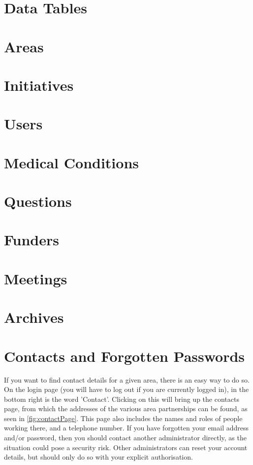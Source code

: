 \documentclass{bhcguides}
\begin{document}
\section{Data Tables}
\label{sec:datatables}

\section{Areas}
\label{sec:areas}

\section{Initiatives}
\label{sec:initiatives}

\section{Users}
\label{sec:users}

\section{Medical Conditions}
\label{sec:medical}

\section{Questions}
\label{sec:questions}

\section{Funders}
\label{sec:funders}

\section{Meetings}
\label{sec:meetings}

\section{Archives}
\label{sec:archives}

\section{Contacts and Forgotten Passwords}
\label{sec:contacts}

If you want to find contact details for a given area, there is an easy way to do so. On the login page (you will have to log out if you are currently logged in), in the bottom right is the word 'Contact'. Clicking on this will bring up the contacts page, from which the addresses of the various area partnerships can be found, as seen in \autoref{fig:contactPage}. This page also includes the names and roles of people working there, and a telephone number. If you have forgotten your email address and/or password, then you should contact another administrator directly, as the situation could pose a security risk. Other administrators can reset your account details, but should only do so with your explicit authorisation.
\end{document}
